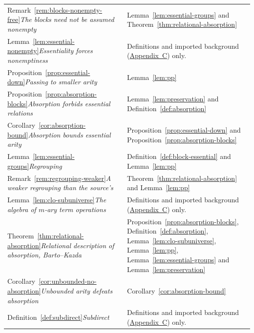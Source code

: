 \documentclass[11pt]{article}
\theoremstyle{mainplain}
\theoremstyle{mainroman}
\theoremstyle{definition}
\numberwithin{equation}{section}
\begin{document}
\begin{longtable}{@{}>{\raggedright\arraybackslash}p{}>{\raggedright\arraybackslash}p{}@{}}
Remark~\ref{rem:blocks-nonempty-free}\newline\emph{The blocks need not be assumed nonempty} & Lemma~\ref{lem:essential-groups} and Theorem~\ref{thm:relational-absorption} \\
Lemma~\ref{lem:essential-nonempty}\newline\emph{Essentiality forces nonemptiness} & Definitions and imported background (\hyperref[app:background]{Appendix~C}) only. \\
Proposition~\ref{prop:essential-down}\newline\emph{Passing to smaller arity} & Lemma~\ref{lem:pp} \\
Proposition~\ref{prop:absorption-blocks}\newline\emph{Absorption forbids essential relations} & Lemma~\ref{lem:preservation} and Definition~\ref{def:absorption} \\
Corollary~\ref{cor:absorption-bound}\newline\emph{Absorption bounds essential arity} & Proposition~\ref{prop:essential-down} and Proposition~\ref{prop:absorption-blocks} \\
Lemma~\ref{lem:essential-groups}\newline\emph{Regrouping} & Definition~\ref{def:block-essential} and Lemma~\ref{lem:pp} \\
Remark~\ref{rem:regrouping-weaker}\newline\emph{A weaker regrouping than the source's} & Theorem~\ref{thm:relational-absorption} and Lemma~\ref{lem:pp} \\
Lemma~\ref{lem:clo-subuniverse}\newline\emph{The algebra of $m$-ary term operations} & Definitions and imported background (\hyperref[app:background]{Appendix~C}) only. \\
Theorem~\ref{thm:relational-absorption}\newline\emph{Relational description of absorption, Barto--Kazda \cite{BartoKazda}} & Proposition~\ref{prop:absorption-blocks}, Definition~\ref{def:absorption}, Lemma~\ref{lem:clo-subuniverse}, Lemma~\ref{lem:pp}, Lemma~\ref{lem:essential-groups} and Lemma~\ref{lem:preservation} \\
Corollary~\ref{cor:unbounded-no-absorption}\newline\emph{Unbounded arity defeats absorption} & Corollary~\ref{cor:absorption-bound} \\
Definition~\ref{def:subdirect}\newline\emph{Subdirect} & Definitions and imported background (\hyperref[app:background]{Appendix~C}) only. \\

\end{longtable}
\end{document}
